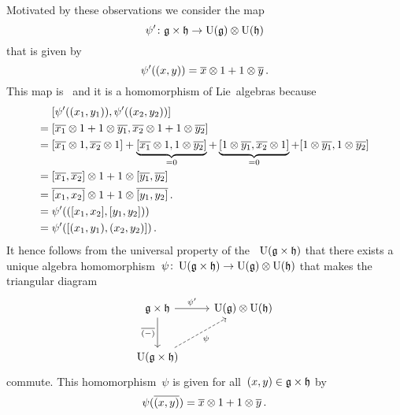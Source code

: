 \begin{example}
\begin{itemize}
      Motivated by these observations we consider the map
      \[
        \psi'
        \colon
        \mathfrak{g} \times \mathfrak{h}
        \to
        \operatorname{U}(\mathfrak{g}) \otimes \operatorname{U}(\mathfrak{h})
      \]
      that is given by
      \[
        \psi'((x,y))
        =
        \overline{x} \otimes 1 + 1 \otimes \overline{y} \,.
      \]
      This map is~{\linear{$\kf$}} and it is a homomorphism of Lie~algebras because
      \begin{align*}
        {}&
        [\psi'((x_1, y_1)), \psi'((x_2, y_2))]
        \\
        ={}&
        [
          \overline{x_1} \otimes 1 + 1 \otimes \overline{y_1},
          \overline{x_2} \otimes 1 + 1 \otimes \overline{y_2}
        ]
        \\
        ={}&
          [\overline{x_1} \otimes 1, \overline{x_2} \otimes 1]
        + \underbrace{ [\overline{x_1} \otimes 1, 1 \otimes \overline{y_2}] }_{=0}
        + \underbrace{ [1 \otimes \overline{y_1}, \overline{x_2} \otimes 1] }_{=0}
        + [1 \otimes \overline{y_1}, 1 \otimes \overline{y_2}]
        \\
        ={}&
          [\overline{x_1}, \overline{x_2}] \otimes 1
        + 1 \otimes [\overline{y_1}, \overline{y_2}]
        \\
        ={}&
          \overline{[x_1, x_2]} \otimes 1
        + 1 \otimes \overline{[y_1, y_2]}  \,.
        \\
        ={}&
        \psi'( ( [x_1, x_2], [y_1, y_2] ) )
        \\
        ={}&
        \psi'( [(x_1, y_1), (x_2, y_2)] ) \,.
      \end{align*}
      It hence follows from the universal property of the {\ua}~$\operatorname{U}(\mathfrak{g} \times \mathfrak{h})$ that there exists a unique algebra homomorphism~$\psi \colon \operatorname{U}(\mathfrak{g} \times \mathfrak{h}) \to \operatorname{U}(\mathfrak{g}) \otimes \operatorname{U}(\mathfrak{h})$ that makes the triangular diagram
      \[
        \begin{tikzcd}[row sep = large]
          \glie \times \hlie
          \arrow{r}[above]{\psi'}
          \arrow{d}[left]{\class{(-)}}
          &
          \Univ(\glie) \tensor \Univ(\hlie)
          \\
          \Univ(\glie \times \hlie)
          \arrow[dashed]{ur}[below right]{\psi}
          &
          {}
        \end{tikzcd}
      \]
      commute.
      This homomorphism~$\psi$ is given for all~$(x, y) \in \mathfrak{g} \times \mathfrak{h}$ by
      \[
        \psi( \overline{(x,y)} )
        =
        \overline{x} \otimes 1 + 1 \otimes \overline{y} \,.
      \]
      

\end{itemize}
\end{example}
